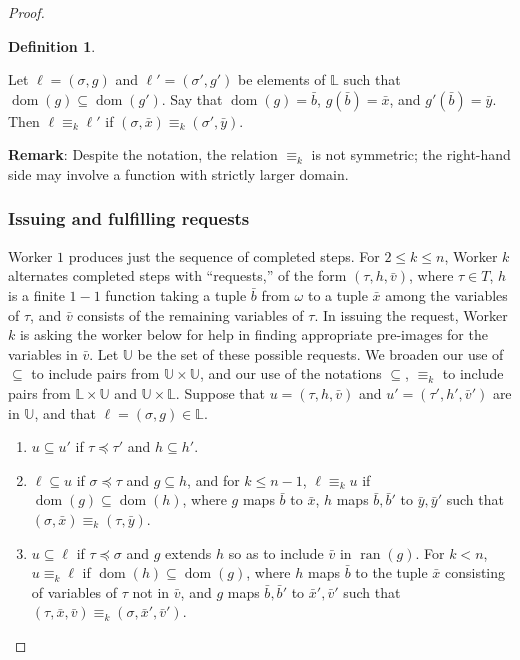 \documentclass{article}
\DeclareMathOperator{\dom}{dom}
\DeclareMathOperator{\ran}{ran}
\theoremstyle{definition}
\newtheorem{defn}[thm]{Definition}
\begin{document}
\begin{proof}
		\begin{defn}\label{def-equiv-g}
			
			Let $\ell = (\sigma,g)$ and $\ell' = (\sigma',g')$ be elements of $\mathbb{L}$ such that $\dom(g)\subseteq \dom(g')$. Say that $\dom(g) = \bar{b}$, $g(\bar{b}) = \bar{x}$, and $g'(\bar{b}) = \bar{y}$. 
			Then $\ell\equiv_k\ell'$ if $(\sigma,\bar{x})\equiv_k (\sigma',\bar{y})$. 
			
		\end{defn}
		
		\noindent
		\textbf{Remark}: Despite the notation, the relation $\equiv_k$ is not symmetric; the right-hand side may involve a function with strictly larger domain. 
		
		\subsubsection{Issuing and fulfilling requests}
		
		Worker $1$ produces just the sequence of completed steps. For $2\leq k\leq n$, Worker $k$ alternates completed steps with ``requests,'' of the form $(\tau,h,\bar{v})$, where $\tau\in T$, $h$ is a finite $1-1$ function taking a tuple $\bar{b}$ from $\omega$ to a tuple $\bar{x}$ among the variables of $\tau$, and $\bar{v}$ consists of the remaining variables of $\tau$. In issuing the request, Worker $k$ is asking the worker below for help in finding appropriate pre-images for the variables in $\bar{v}$. Let $\mathbb{U}$ be the set of these possible requests. 
We broaden our use of $\subseteq$ to include pairs from $\mathbb{U}\times\mathbb{U}$, and our use of the notations $\subseteq$, $\equiv_k$ to include pairs from $\mathbb{L}\times\mathbb{U}$ and $\mathbb{U}\times\mathbb{L}$. Suppose that $u = (\tau,h,\bar{v})$ and $u' = (\tau',h',\bar{v}')$ are in $\mathbb{U}$, and that $\ell = (\sigma,g)\in\mathbb{L}$. 
		
		\begin{enumerate}
			
			\item $u\subseteq u'$ if $\tau\preceq\tau'$ and $h\subseteq h'$.
			
			\item $\ell\subseteq u$ if $\sigma\preceq\tau$ and $g\subseteq h$, and for $k\leq n-1$, $\ell\equiv_k u$ if $\dom(g)\subseteq \dom(h)$, where $g$ maps $\bar{b}$ to $\bar{x}$, $h$ maps $\bar{b},\bar{b}'$ to $\bar{y},\bar{y}'$ such that $(\sigma,\bar{x})\equiv_k (\tau,\bar{y})$. 
			
			\item $u\subseteq\ell$ if $\tau\preceq\sigma$ and $g$ extends $h$ so as to include $\bar{v}$ in $\ran(g)$. For $k < n$, $u\equiv_k\ell$ if $\dom(h)\subseteq \dom(g)$, where $h$ maps $\bar{b}$ to the tuple $\bar{x}$ consisting of variables of $\tau$ not in $\bar{v}$, and $g$ maps $\bar{b},\bar{b}'$ to $\bar{x}',\bar{v}'$ such that $(\tau,\bar{x},\bar{v})\equiv_k(\sigma,\bar{x}',\bar{v}')$. 
			

\end{enumerate}
\end{proof}
\end{document}

